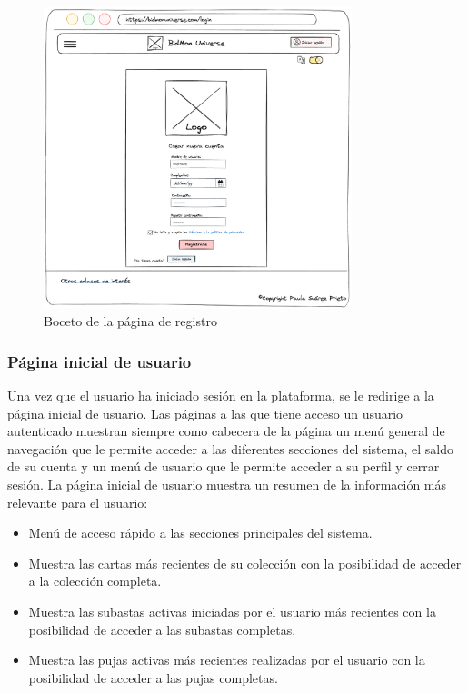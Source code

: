 \begin{figure}[H]
    \centering
    \includegraphics[width=0.8\textwidth]{figures/6-Analisis/6-Interfaz/prototipos/signup.png}
    \caption{Boceto de la página de registro}
    \label{fig:p_signup}
\end{figure}

\subsubsection{Página inicial de usuario}
Una vez que el usuario ha iniciado sesión en la plataforma, se le redirige a la página inicial de usuario.
Las páginas a las que tiene acceso un usuario autenticado muestran siempre como cabecera de la página un menú general de navegación que le permite acceder a las diferentes secciones del sistema,
el saldo de su cuenta y un menú de usuario que le permite acceder a su perfil y cerrar sesión.
La página inicial de usuario muestra un resumen de la información más relevante para el usuario:
\begin{itemize}
    \item Menú de acceso rápido a las secciones principales del sistema.
    \item Muestra las cartas más recientes de su colección con la posibilidad de acceder a la colección completa.
    \item Muestra las subastas activas iniciadas por el usuario más recientes con la posibilidad de acceder a las subastas completas.
    \item Muestra las pujas activas más recientes realizadas por el usuario con la posibilidad de acceder a las pujas completas.
\end{itemize}


